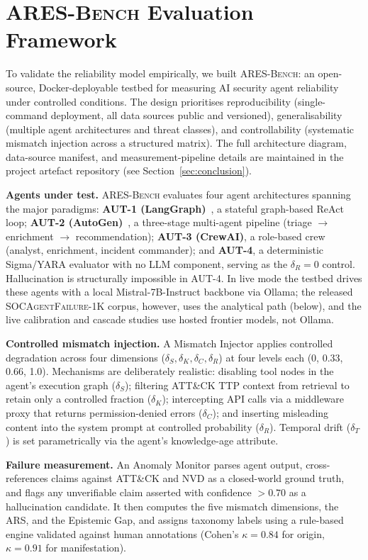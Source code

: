 \documentclass[journal,compsoc]{IEEEtran}
\newcommand{\ARESBench}{\textsc{ARES-Bench}}
\newcommand{\SAFK}{\textsc{SOCAgentFailure-1K}}
\begin{document}
\section{\ARESBench{} Evaluation Framework}
\label{sec:aresbench}

To validate the reliability model empirically, we built
\ARESBench{}: an open-source, Docker-deployable testbed for measuring
AI security agent reliability under controlled conditions. The design
prioritises reproducibility (single-command deployment, all data
sources public and versioned), generalisability (multiple agent
architectures and threat classes), and controllability (systematic
mismatch injection across a structured matrix). The full architecture
diagram, data-source manifest, and measurement-pipeline details are
maintained in the project artefact repository (see Section~\ref{sec:conclusion}).

\textbf{Agents under test.} \ARESBench{} evaluates four agent
architectures spanning the major paradigms: \textbf{AUT-1
(LangGraph)}~\cite{langgraph2024}, a stateful graph-based ReAct loop;
\textbf{AUT-2 (AutoGen)}~\cite{wu2023autogen}, a three-stage
multi-agent pipeline (triage $\to$ enrichment $\to$ recommendation);
\textbf{AUT-3 (CrewAI)}, a role-based crew (analyst, enrichment,
incident commander); and \textbf{AUT-4}, a deterministic Sigma/YARA
evaluator with no LLM component, serving as the $\delta_R = 0$
control. Hallucination is structurally impossible in AUT-4. In live mode the
testbed drives these agents with a local Mistral-7B-Instruct backbone
via Ollama; the released \SAFK{} corpus, however, uses the analytical
path (below), and the live calibration and cascade studies use hosted
frontier models, not Ollama.

\textbf{Controlled mismatch injection.} A Mismatch Injector applies
controlled degradation across four dimensions ($\delta_S, \delta_K,
\delta_C, \delta_R$) at four levels each (0, 0.33, 0.66, 1.0).
Mechanisms are deliberately realistic: disabling tool nodes in the
agent's execution graph ($\delta_S$); filtering ATT\&CK TTP context
from retrieval to retain only a controlled fraction ($\delta_K$);
intercepting API calls via a middleware proxy that returns
permission-denied errors ($\delta_C$); and inserting misleading content
into the system prompt at controlled probability ($\delta_R$).
Temporal drift ($\delta_T$) is set parametrically via the agent's
knowledge-age attribute.

\textbf{Failure measurement.} An Anomaly Monitor parses agent
output, cross-references claims against ATT\&CK and NVD as a
closed-world ground truth, and flags any unverifiable claim asserted
with confidence $> 0.70$ as a hallucination candidate. It then
computes the five mismatch dimensions, the ARS, and the Epistemic Gap,
and assigns taxonomy labels using a rule-based engine validated
against human annotations (Cohen's $\kappa = 0.84$ for origin,
$\kappa = 0.91$ for manifestation).
\end{document}

